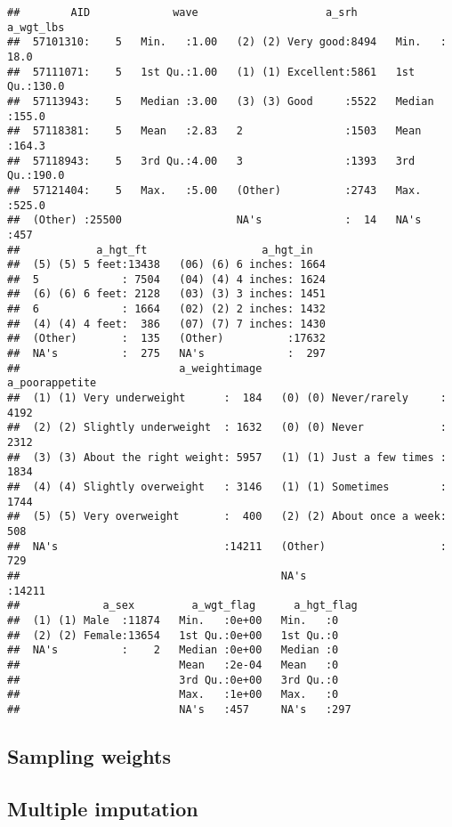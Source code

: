 \documentclass[
]{book}
\begin{document}
\begin{verbatim}
##        AID             wave                    a_srh        a_wgt_lbs    
##  57101310:    5   Min.   :1.00   (2) (2) Very good:8494   Min.   : 18.0  
##  57111071:    5   1st Qu.:1.00   (1) (1) Excellent:5861   1st Qu.:130.0  
##  57113943:    5   Median :3.00   (3) (3) Good     :5522   Median :155.0  
##  57118381:    5   Mean   :2.83   2                :1503   Mean   :164.3  
##  57118943:    5   3rd Qu.:4.00   3                :1393   3rd Qu.:190.0  
##  57121404:    5   Max.   :5.00   (Other)          :2743   Max.   :525.0  
##  (Other) :25500                  NA's             :  14   NA's   :457    
##            a_hgt_ft                  a_hgt_in    
##  (5) (5) 5 feet:13438   (06) (6) 6 inches: 1664  
##  5             : 7504   (04) (4) 4 inches: 1624  
##  (6) (6) 6 feet: 2128   (03) (3) 3 inches: 1451  
##  6             : 1664   (02) (2) 2 inches: 1432  
##  (4) (4) 4 feet:  386   (07) (7) 7 inches: 1430  
##  (Other)       :  135   (Other)          :17632  
##  NA's          :  275   NA's             :  297  
##                         a_weightimage                     a_poorappetite 
##  (1) (1) Very underweight      :  184   (0) (0) Never/rarely     : 4192  
##  (2) (2) Slightly underweight  : 1632   (0) (0) Never            : 2312  
##  (3) (3) About the right weight: 5957   (1) (1) Just a few times : 1834  
##  (4) (4) Slightly overweight   : 3146   (1) (1) Sometimes        : 1744  
##  (5) (5) Very overweight       :  400   (2) (2) About once a week:  508  
##  NA's                          :14211   (Other)                  :  729  
##                                         NA's                     :14211  
##             a_sex         a_wgt_flag      a_hgt_flag 
##  (1) (1) Male  :11874   Min.   :0e+00   Min.   :0    
##  (2) (2) Female:13654   1st Qu.:0e+00   1st Qu.:0    
##  NA's          :    2   Median :0e+00   Median :0    
##                         Mean   :2e-04   Mean   :0    
##                         3rd Qu.:0e+00   3rd Qu.:0    
##                         Max.   :1e+00   Max.   :0    
##                         NA's   :457     NA's   :297
\end{verbatim}

\hypertarget{sampling-weights}{%
\subsection{Sampling weights}\label{sampling-weights}}

\hypertarget{multiple-imputation}{%
\subsection{Multiple imputation}\label{multiple-imputation}}
\end{document}

